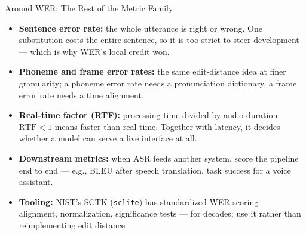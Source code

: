 \begin{frame}{Around WER: The Rest of the Metric Family}
\begin{itemize}
    \item \textbf{Sentence error rate:} the whole utterance is right or wrong. One substitution costs the
      entire sentence, so it is too strict to steer development --- which is why WER's local credit won.
    \item \textbf{Phoneme and frame error rates:} the same edit-distance idea at finer granularity; a
      phoneme error rate needs a pronunciation dictionary, a frame error rate needs a time alignment.
    \item \textbf{Real-time factor (RTF):} processing time divided by audio duration --- $\text{RTF} < 1$
      means faster than real time. Together with latency, it decides whether a model can serve a live
      interface at all.
    \item \textbf{Downstream metrics:} when ASR feeds another system, score the pipeline end to end ---
      e.g., BLEU after speech translation, task success for a voice assistant.
    \item \textbf{Tooling:} NIST's SCTK (\texttt{sclite}) has standardized WER scoring --- alignment,
      normalization, significance tests --- for decades; use it rather than reimplementing edit distance.
\end{itemize}
\end{frame}

